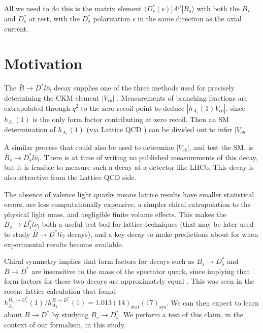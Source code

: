 All we need to do this is the matrix element $\langle D^*_s(\epsilon)| A^{\mu} | B_s \rangle$ with both the $B_s$ and $D_s^*$ at rest, with the $D_s^*$ polarization $\epsilon$ in the same direction as the axial current.

\section{Motivation}
\label{sec:BsDsstar_intro}

The $\bar{B}\to D^{*} l \bar{\nu}_l$ decay supplies one of the three methods used for precisely determining the CKM element $|V_{cb}|$ \cite{Schroder:1994aj,PhysRevLett.64.2117,PhysRevD.43.651,ALBRECHT1992195,Barish:1994mu,BUSKULIC1996449,Buskulic:1994dz,Abbiendi:2000hk,Abreu:2001ic,Adam:2002uw,Abdallah:2004rz,Aubert:2007rs,Aubert:2007qs,Aubert:2008yv,Dungel:2010uk,Abdesselam:2017kjf,Bailey:2014tva,Abdesselam:2018nnh}.
Measurements of branching fractions are extrapolated through $q^2$ to the zero recoil point to deduce $|h_{A_1}(1)V_{cb}|$, since $h_{A_1}(1)$ is the only form factor contributing at zero recoil. Then an SM determination of $h_{A_1}(1)$ (via Lattice QCD \cite{Bailey:2014tva,Harrison:2017fmw}) can be divided out to infer $|V_{cb}|$.

A similar process that could also be used to determine $|V_{cb}|$, and test the SM, is $\bar{B}_s \to D^*_s l\bar{\nu}_l$. There is at time of writing no published measurements of this decay, but it is feasible to measure such a decay at a detector like LHCb. This decay is also attractive from the Lattice QCD side.

The absence of valence light quarks means lattice results have smaller statistical errors, are less computationally expensive, a simpler chiral extrapolation to the physical light mass, and negligible finite volume effects. This makes the $\bar{B}_s \to D^*_s l\bar{\nu}_l$ both a useful test bed for lattice techniques (that may be later used to study $\bar{B} \to D^* l \bar{\nu}_l$ decays), and a key decay to make predictions about for when experimental results become available.

Chiral symmetry implies that form factors for decays such as $B_s \to D^*_s$ and $B \to D^*$ are insensitive to the mass of the spectator quark, since  implying that form factors for these two decays are approximately equal \cite{Laiho:2005ue}. This was seen in the recent lattice calculation \cite{Harrison:2017fmw} that found $h_{A_1}^{B_s\to D_s^*}(1) / h_{A_1}^{B\to D^*}(1) = 1.013(14)_{\text{stat}}(17)_{\text{sys}}$. We can then expect to learn about $B\to D^*$ by studying $B_s\to D_s^*$. We perform a test of this claim, in the context of our formalism, in this study.

